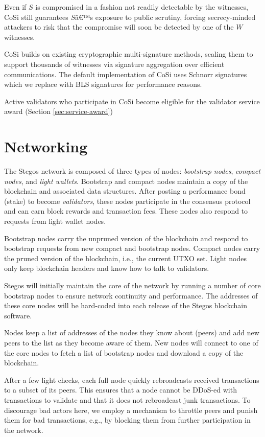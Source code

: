 \documentclass[8pt,fleqn,openany]{book}
\begin{document}
	Even if $S$ is compromised in a fashion not readily detectable by the witnesses, CoSi still guarantees $S$â€™s exposure to public scrutiny, forcing secrecy-minded attackers to risk that the compromise will soon be detected by one of the $W$ witnesses. 
	
	CoSi builds on existing cryptographic multi-signature methods, scaling them to support thousands of witnesses via signature aggregation over efficient communications. The default implementation of CoSi uses Schnorr signatures which we replace with BLS signatures for performance reasons.
	
	Active validators who participate in CoSi become eligible for the validator service award (Section \ref{sec:service-award})
	
	\section{Networking}
	The Stegos network is composed of three types of nodes: \textit{bootstrap nodes}, \textit{compact nodes}, and \textit{light wallets}. Bootstrap and compact nodes maintain a copy of the blockchain and associated data structures. After posting a performance bond (stake) to become \textit{validators}, these nodes participate in the consensus protocol and can earn block rewards and transaction fees. These nodes also respond to requests from light wallet nodes.
	
	Bootstrap nodes carry the unpruned version of the blockchain and respond to bootstrap requests from new compact and bootstrap nodes. Compact nodes carry the pruned version of the blockchain, i.e., the current UTXO set. Light nodes only keep blockchain headers and know how to talk to validators. 
	
	Stegos will initially maintain the core of the network by running a number of core bootstrap nodes to ensure network continuity and performance. The addresses of these core nodes will be hard-coded into each release of the Stegos blockchain software.
	
	Nodes keep a list of addresses of the nodes they know about (peers) and add new peers to the list as they become aware of them. New nodes will connect to one of the core nodes to fetch a list of bootstrap nodes and download a copy of the blockchain. 
	
	After a few light checks, each full node quickly rebroadcasts received transactions to a subset of its peers. This ensures that a node cannot be DDoS-ed with transactions to validate and that it does not rebroadcast junk transactions. To discourage bad actors here, we employ a mechanism to throttle peers and punish them for bad transactions, e.g., by blocking them from further participation in the network.
	
\end{document}

